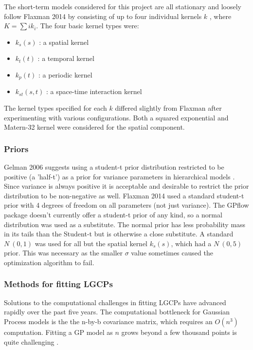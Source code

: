 The short-term models considered for this project are all stationary and loosely follow Flaxman 2014 by consisting of up to four individual kernels $k$ , where $K=\sum{i}k_i$. The four basic kernel types were:

\begin{itemize}
  \item $k_s(s)$ : a spatial kernel
  \item $k_t(t)$ : a temporal kernel
  \item $k_p(t)$ : a periodic kernel
  \item $k_{st}(s,t)$ : a space-time interaction kernel
\end{itemize}

The kernel types specified for each $k$ differed slightly from Flaxman after experimenting with various configurations. Both a squared exponential and Matern-32 kernel were considered for the spatial component.



\subsubsection{Priors}

Gelman 2006 suggests using a student-t prior distribution restricted to be positive (a 'half-t') as a prior for variance parameters in hierarchical models \cite{gelman_2006}. Since variance is always positive it is acceptable and desirable to restrict the prior distribution to be non-negative as well. Flaxman 2014 used a standard student-t prior with 4 degrees of freedom on all parameters (not just variance). The GPflow package doesn't currently offer a student-t prior of any kind, so a normal distribution was used as a substitute. The normal prior has less probability mass in its tails than the Student-t but is otherwise a close substitute. A standard $N~(0,1)$ was used for all but the spatial kernel $k_s(s)$, which had a $N~(0,5)$ prior. This was necessary as the smaller $\sigma$ value sometimes caused the optimization algorithm to fail.

\subsubsection{Methods for fitting LGCPs}

Solutions to the computational challenges in fitting LGCPs have advanced rapidly over the past five years. The computational bottleneck for Gaussian Process models is the the n-by-b covariance matrix, which requires an $O(n^3)$ computation. Fitting a GP model as $n$ grows beyond a few thousand points is quite challenging \cite{gelman2013bayesian}. \par

